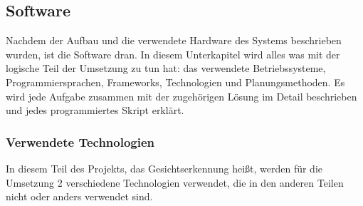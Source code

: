 \subsection{Software}
Nachdem der Aufbau und die verwendete Hardware des Systems beschrieben wurden, ist die Software dran. In diesem Unterkapitel wird alles was mit der logische Teil der Umsetzung zu tun hat: das verwendete Betriebssysteme, Programmiersprachen, Frameworks, Technologien und Planungsmethoden. Es wird jede Aufgabe zusammen mit der zugehörigen Lösung im Detail beschrieben und jedes programmiertes Skript erklärt.
\subsubsection{Verwendete Technologien}
In diesem Teil des Projekts, das Gesichtserkennung heißt, werden für die Umsetzung 2 verschiedene Technologien verwendet, die in den anderen Teilen nicht oder anders verwendet sind.

